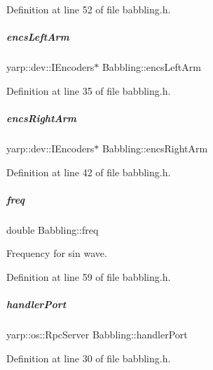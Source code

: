 Definition at line 52 of file babbling.\+h.

\mbox{\label{group__babbling_ab5de0e5815a8c642e2c5f804675f8734}} 
\subparagraph{\texorpdfstring{encs\+Left\+Arm}{encsLeftArm}}
{\footnotesize\ttfamily yarp\+::dev\+::\+I\+Encoders$\ast$ Babbling\+::encs\+Left\+Arm\hspace{0.3cm}{\ttfamily [protected]}}



Definition at line 35 of file babbling.\+h.

\mbox{\label{group__babbling_a540345074d41b623588cb5e94d18a8c5}} 
\subparagraph{\texorpdfstring{encs\+Right\+Arm}{encsRightArm}}
{\footnotesize\ttfamily yarp\+::dev\+::\+I\+Encoders$\ast$ Babbling\+::encs\+Right\+Arm\hspace{0.3cm}{\ttfamily [protected]}}



Definition at line 42 of file babbling.\+h.

\mbox{\label{group__babbling_a48a9e302ed7cc9487963e2588cab2726}} 
\subparagraph{\texorpdfstring{freq}{freq}}
{\footnotesize\ttfamily double Babbling\+::freq\hspace{0.3cm}{\ttfamily [protected]}}



Frequency for sin wave. 



Definition at line 59 of file babbling.\+h.

\mbox{\label{group__babbling_afc20fc52862c90c52ee56628e1e52d65}} 
\subparagraph{\texorpdfstring{handler\+Port}{handlerPort}}
{\footnotesize\ttfamily yarp\+::os\+::\+Rpc\+Server Babbling\+::handler\+Port\hspace{0.3cm}{\ttfamily [protected]}}



Definition at line 30 of file babbling.\+h.

